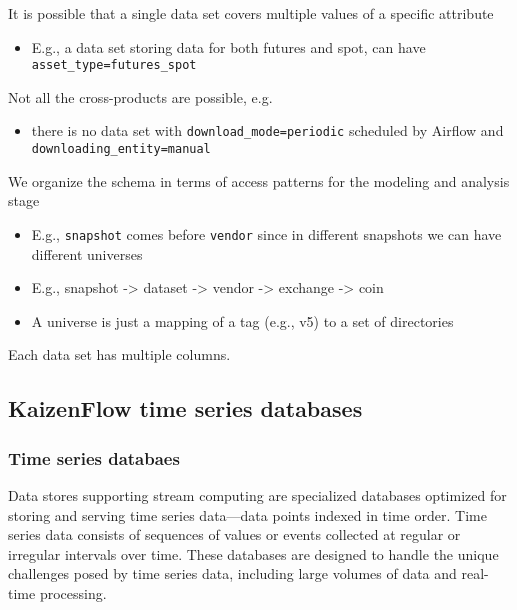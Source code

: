 \documentclass[11pt, reqno]{amsart}
\theoremstyle{definition}
\theoremstyle{remark}
\begin{document}
It is possible that a single data set covers multiple values of a
specific attribute

\begin{itemize}
  \item E.g., a data set storing data for both futures and spot, can have
        \verb|asset_type=futures_spot|
\end{itemize}

Not all the cross-products are possible, e.g.

\begin{itemize}
  \item there is no data set with \verb|download_mode=periodic| scheduled
        by Airflow and \verb|downloading_entity=manual|
\end{itemize}

We organize the schema in terms of access patterns for the modeling and
analysis stage

\begin{itemize}
  \item E.g., \verb|snapshot| comes before \verb|vendor| since in
        different snapshots we can have different universes
  \item E.g., snapshot -\textgreater{} dataset -\textgreater{} vendor
        -\textgreater{} exchange -\textgreater{} coin
  \item A universe is just a mapping of a tag (e.g., v5) to a set of
        directories
\end{itemize}

Each data set has multiple columns.

\subsection{KaizenFlow time series databases}

\subsubsection{Time series databaes}
Data stores supporting stream computing are specialized databases
optimized for storing and serving time series data—data points indexed in time
order. Time series data consists of sequences of values or events
collected at regular or irregular intervals over time. These databases are
designed to handle the unique challenges posed by time series data, including
large volumes of data and real-time processing.
\end{document}
